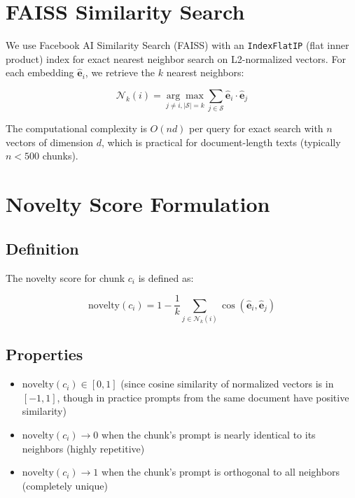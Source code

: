 \documentclass[11pt,a4paper]{article}
\begin{document}
\section{FAISS Similarity Search}

We use Facebook AI Similarity Search (FAISS) \citep{johnson2019billion} with an
\texttt{IndexFlatIP} (flat inner product) index for exact nearest neighbor
search on L2-normalized vectors. For each embedding $\hat{\mathbf{e}}_i$, we
retrieve the $k$ nearest neighbors:

\begin{equation}
\mathcal{N}_k(i) = \underset{j \neq i, |\mathcal{S}|=k}{\arg\max} \sum_{j \in \mathcal{S}} \hat{\mathbf{e}}_i \cdot \hat{\mathbf{e}}_j
\end{equation}

The computational complexity is $O(nd)$ per query for exact search with $n$
vectors of dimension $d$, which is practical for document-length texts (typically
$n < 500$ chunks).

\section{Novelty Score Formulation}

\subsection{Definition}

The novelty score for chunk $c_i$ is defined as:

\begin{equation}
\text{novelty}(c_i) = 1 - \frac{1}{k} \sum_{j \in \mathcal{N}_k(i)} \cos(\hat{\mathbf{e}}_i, \hat{\mathbf{e}}_j)
\end{equation}

\subsection{Properties}

\begin{itemize}
\item $\text{novelty}(c_i) \in [0, 1]$ (since cosine similarity of normalized
vectors is in $[-1, 1]$, though in practice prompts from the same document have
positive similarity)
\item $\text{novelty}(c_i) \to 0$ when the chunk's prompt is nearly identical to
its neighbors (highly repetitive)
\item $\text{novelty}(c_i) \to 1$ when the chunk's prompt is orthogonal to all
neighbors (completely unique)
\end{itemize}
\end{document}
